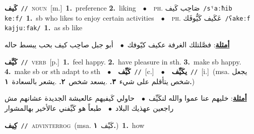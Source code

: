 \documentclass[10pt,a4paper,twoside]{article} %
\begin{document}
\begin{multicols}{2}
{\setlength\topsep{0pt}\textbf{\foreignlanguage{arabic}{كَيف}}\ {\color{gray}\texttt{//}\color{black}}\ \textsc{noun}\ [m.]\ \textbf{1.}~preference  \textbf{2.}~liking\ \ $\bullet$\ \ \textsc{ph.} \color{gray} \foreignlanguage{arabic}{صَاحِب كَيف}\color{black}\ {\color{gray}\texttt{/{\sffamily sˤaːħib keːf}/}\color{black}}\ \textbf{1.}~sb who likes to enjoy certain activities\ \ $\bullet$\ \ \textsc{ph.} \color{gray} \foreignlanguage{arabic}{عَكَيف كَيُّوفَك}\color{black}\ {\color{gray}\texttt{/{\sffamily ʕakeːf kajjuːfak}/}\color{black}}\ \textbf{1.}~as sb like\  \begin{flushright}\color{gray}\foreignlanguage{arabic}{\textbf{\underline{\foreignlanguage{arabic}{أمثلة}}}: فصَّلتلك الغرفة عكيف كيّوفك\ $\bullet$\ \  أبو جبل صاحِب كيف بحب يبسط حاله}\end{flushright}\color{black}} \vspace{2mm}

{\setlength\topsep{0pt}\textbf{\foreignlanguage{arabic}{كَيَّف}}\ {\color{gray}\texttt{//}\color{black}}\ \textsc{verb}\ [p.]\ \textbf{1.}~feel happy.  \textbf{2.}~have pleasure in sth.  \textbf{3.}~make sb happy.  \textbf{4.}~make sb or sth adapt to sth\ \ $\bullet$\ \ \setlength\topsep{0pt}\textbf{\foreignlanguage{arabic}{كَيِّف}}\ {\color{gray}\texttt{//}\color{black}}\ [c.]\ \ $\bullet$\ \ \setlength\topsep{0pt}\textbf{\foreignlanguage{arabic}{يكَيِّف}}\ {\color{gray}\texttt{//}\color{black}}\ [i.]\ \color{gray}(msa. \foreignlanguage{arabic}{يجعل شخص يتأقلم على شيء}~\foreignlanguage{arabic}{\textbf{٣.}}  .\foreignlanguage{arabic}{يسعد شخص}~\foreignlanguage{arabic}{\textbf{٢.}}  .\foreignlanguage{arabic}{يشعر بالسعادة}~\foreignlanguage{arabic}{\textbf{١.}})\color{black}\  \begin{flushright}\color{gray}\foreignlanguage{arabic}{\textbf{\underline{\foreignlanguage{arabic}{أمثلة}}}: خليهم عنا عموا والله لنكَيِّف\ $\bullet$\ \  حاولي كَيفيهم عالعيشة الجديدة عشانهم مش راجعين عهذيك البلاد\ $\bullet$\ \  طبعاً هو كَيِّفني عالأخير بهالمشوار}\end{flushright}\color{black}} \vspace{2mm}

{\setlength\topsep{0pt}\textbf{\foreignlanguage{arabic}{كِيف}}\ {\color{gray}\texttt{//}\color{black}}\ \textsc{adv\textunderscore interrog}\ \color{gray}(msa. \foreignlanguage{arabic}{كَيْف}~\foreignlanguage{arabic}{\textbf{١.}})\color{black}\ \textbf{1.}~how\ } \vspace{2mm}


\end{multicols}
\end{document}
